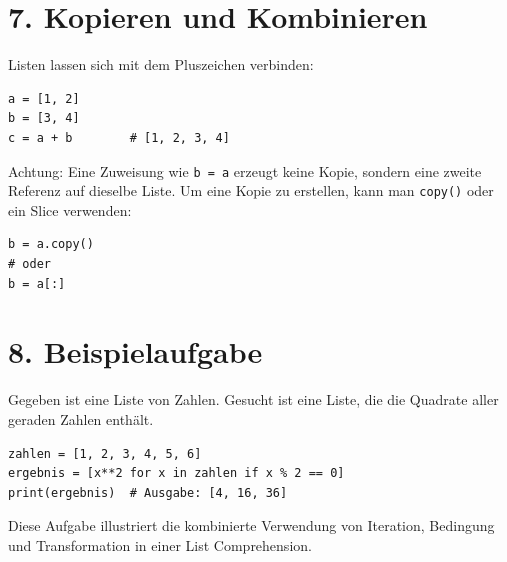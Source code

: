 \documentclass[12pt]{article}
\begin{document}
	\section*{7. Kopieren und Kombinieren}
	
	Listen lassen sich mit dem Pluszeichen verbinden:
	
\begin{verbatim}
a = [1, 2]
b = [3, 4]
c = a + b        # [1, 2, 3, 4]
\end{verbatim}
	
	Achtung: Eine Zuweisung wie \texttt{b = a} erzeugt keine Kopie, sondern eine zweite Referenz auf dieselbe Liste. Um eine Kopie zu erstellen, kann man \texttt{copy()} oder ein Slice verwenden:
	
\begin{verbatim}
b = a.copy()
# oder
b = a[:]
\end{verbatim}
	
	\section*{8. Beispielaufgabe}
	
	Gegeben ist eine Liste von Zahlen. Gesucht ist eine Liste, die die Quadrate aller geraden Zahlen enthält.
	
\begin{verbatim}
zahlen = [1, 2, 3, 4, 5, 6]
ergebnis = [x**2 for x in zahlen if x % 2 == 0]
print(ergebnis)  # Ausgabe: [4, 16, 36]
\end{verbatim}
	
	Diese Aufgabe illustriert die kombinierte Verwendung von Iteration, Bedingung und Transformation in einer List Comprehension.
	
	
\end{document}
